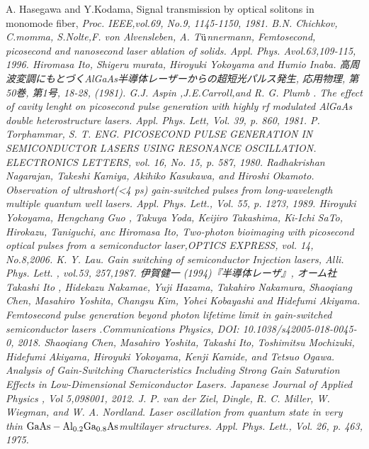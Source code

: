\begin{thebibliography}{99}
 A. Hasegawa and Y.Kodama, Signal transmission by optical solitons in monomode fiber, \sl Proc. IEEE\rm ,vol.69, No.9, 1145-1150, 1981.
 B.N. Chichkov, C.momma, S.Nolte,F. von Alvensleben, A. T$\rm{\ddot{u}}$nnermann, Femtosecond, picosecond and nanosecond laser ablation of solids. \sl Appl. Phys. A\rm vol.63,109-115, 1996.
 Hiromasa Ito, Shigeru 
murata, Hiroyuki Yokoyama and Humio Inaba. 高周波変調にもとづくAlGaAs半導体レーザーからの超短光パルス発生, 応用物理, 第50巻, 第1号, 18-28, (1981).
 G.J. Aspin ,J.E.Carroll,and R. G. Plumb . The effect of cavity lenght on picosecond pulse generation with highly rf modulated AlGaAs double heterostructure lasers. \sl Appl. Phys. Lett\rm , Vol. 39, p. 860, 1981.
 P. Torphammar, S. T. ENG. PICOSECOND PULSE GENERATION IN SEMICONDUCTOR LASERS USING RESONANCE OSCILLATION. \sl ELECTRONICS LETTERS\rm , vol. 16, No. 15, p. 587, 1980.
 Radhakrishan Nagarajan, Takeshi Kamiya, Akihiko Kasukawa, and Hiroshi Okamoto. Observation of ultrashort(<4 ps) gain-switched pulses from long-wavelength multiple quantum well lasers. \sl Appl. Phys. Lett.\rm , Vol. 55, p. 1273, 1989.
 Hiroyuki Yokoyama, Hengchang Guo , Takuya Yoda, Keijiro Takashima, Ki-Ichi SaTo, Hirokazu, Taniguchi, anc Hiromasa Ito, Two-photon bioimaging with picosecond optical pulses from a semiconductor laser,\sl OPTICS EXPRESS\rm , vol. 14, No.8,2006.
 K. Y. Lau. Gain switching of semiconductor Injection lasers, \sl Alli. Phys. Lett. \rm , vol.53, 257,1987.
 伊賀健一 (1994)『半導体レーザ』, オーム社
Takashi Ito
, Hidekazu Nakamae, Yuji Hazama, Takahiro Nakamura, Shaoqiang Chen, Masahiro Yoshita, Changsu Kim, Yohei Kobayashi and Hidefumi Akiyama.
Femtosecond pulse generation beyond photon lifetime limit in gain-switched semiconductor lasers .\sl Communications Physics\rm , DOI: 10.1038/s42005-018-0045-0, 2018. 
 Shaoqiang Chen, Masahiro Yoshita, Takashi Ito, Toshimitsu Mochizuki, Hidefumi Akiyama, Hiroyuki Yokoyama, Kenji Kamide, and Tetsuo Ogawa. Analysis of Gain-Switching Characteristics Including Strong Gain Saturation Effects in Low-Dimensional Semiconductor Lasers. \sl Japanese Journal of Applied  Physics \rm , Vol 5,098001, 2012.
 J. P. van der Ziel, Dingle, R. C. Miller, W. Wiegman, and W. A. Nordland. Laser oscillation from quantum state in very thin $\rm{GaAs-Al_{0.2}Ga_{0.8}As }$multilayer structures. \sl Appl. Phys. Lett.\rm , Vol. 26,  p. 463, 1975. 

\end{thebibliography}

